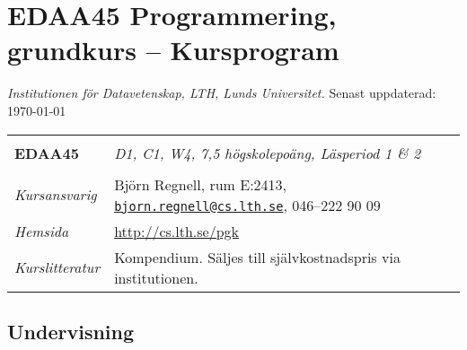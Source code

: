 \documentclass[a4paper,12pt,oneside]{memoir}
\newcommand{\YEAR}{\CurrentYear}
\begin{document}


\section*{EDAA45 Programmering, grundkurs  -- Kursprogram \YEAR}
\emph{Institutionen för Datavetenskap, LTH, Lunds Universitet.} Senast uppdaterad: \today\\

\begin{longtable}[l]{ll}
\hline\\[-0.75em]%

\textbf{EDAA45} & \textit {D1, C1, W4, 7,5 högskolepoäng, Läsperiod 1 \& 2} \\[-0.75em] \tabularnewline
\hline%
\endhead
\emph{Kursansvarig}   & Björn Regnell, rum E:2413,
                        \href{mailto:bjorn.regnell@cs.lth.se}
                        {\nolinkurl{bjorn.regnell@cs.lth.se}},
                        046--222 90 09\tabularnewline
                        \emph{Hemsida}        
                        & \url{http://cs.lth.se/pgk}\tabularnewline
\emph{Kurslitteratur} & Kompendium. Säljes till självkostnadspris via institutionen.\tabularnewline

\hline
\end{longtable}

\subsection{Undervisning}\label{undervisning}
\end{document}
